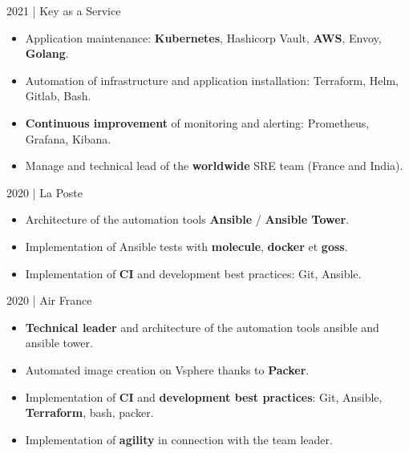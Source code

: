 \documentclass[
	a4paper,
	maincolor=cvartifakt,
	sidecolor=cvgray,
	sidebartextcolor=cvwhite,
	sectioncolor=cvartifakt,
	subsectioncolor=cvgray,
	sidebarwidth=0.36\paperwidth,
    topbottommargin=0.04\paperheight,
]{fortysecondscv}
\makeatletter
\newcommand\thefontsize{\f@size pt}
\makeatother
\begin{document}
\makefrontsidebar{}

\begin{cvtable}[2]
	    {
	    \textcolor{maincolor}{2021 | Key as a Service}
	    \begin{itemize}
            \item Application maintenance: \textbf{Kubernetes}, Hashicorp Vault, \textbf{AWS}, Envoy, \textbf{Golang}.
            \item Automation of infrastructure and application installation: Terraform, Helm, Gitlab, Bash.
            \item \textbf{Continuous improvement} of monitoring and alerting: Prometheus, Grafana, Kibana.
            \item Manage and technical lead of the \textbf{worldwide} SRE team (France and India).
        \end{itemize}
		}
	    {
	    \textcolor{maincolor}{2020 | La Poste}
	    \begin{itemize}
            \item Architecture of the automation tools \textbf{Ansible} / \textbf{Ansible Tower}.
            \item Implementation of Ansible tests with \textbf{molecule}, \textbf{docker} et \textbf{goss}.
            \item Implementation of \textbf{CI} and development best practices: Git, Ansible.
        \end{itemize}
        \vspace{8pt}
	    \textcolor{maincolor}{2020 | Air France}
	    \begin{itemize}
            \item \textbf{Technical leader} and architecture of the automation tools ansible and ansible tower.
            \item Automated image creation on Vsphere thanks to \textbf{Packer}.
            \item Implementation of \textbf{CI} and \textbf{development best practices}: Git, Ansible, \textbf{Terraform}, bash, packer.
            \item Implementation of \textbf{agility} in connection with the team leader.
        \end{itemize}
}
\end{cvtable}
\end{document}
